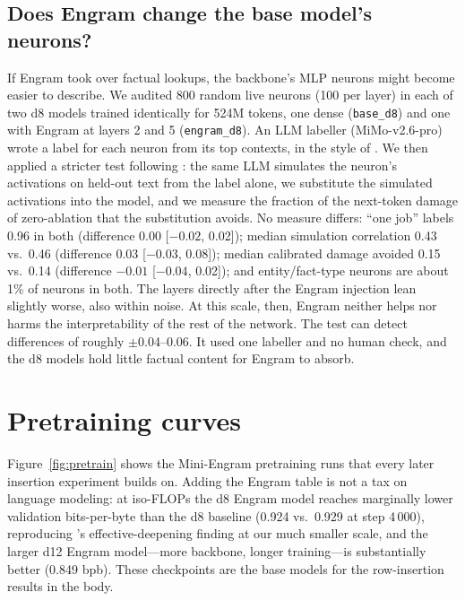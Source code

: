 \documentclass[11pt]{article}
\begin{document}
\subsection{Does Engram change the base model's neurons?}
\label{app:followup-t5}

If Engram took over factual lookups, the backbone's MLP neurons might
become easier to describe. We audited 800 random live neurons
(100 per layer) in each of two d8 models trained identically for
524M tokens, one dense (\texttt{base\_d8}) and one with Engram at
layers 2 and 5 (\texttt{engram\_d8}). An LLM labeller (MiMo-v2.6-pro)
wrote a label for each neuron from its top contexts, in the style of
\citet{bills2023explain}. We then applied a stricter test following
\citet{gao2026notclean}: the same LLM simulates the neuron's
activations on held-out text from the label alone, we substitute the
simulated activations into the model, and we measure the fraction of
the next-token damage of zero-ablation that the substitution avoids.
No measure differs: ``one job'' labels 0.96 in both (difference 0.00
[$-0.02$, 0.02]); median simulation correlation 0.43 vs.\ 0.46
(difference 0.03 [$-0.03$, 0.08]); median calibrated damage avoided
0.15 vs.\ 0.14 (difference $-0.01$ [$-0.04$, 0.02]); and
entity/fact-type neurons are about 1\% of neurons in both. The layers
directly after the Engram injection lean slightly worse, also within
noise. At this scale, then, Engram neither helps nor harms the
interpretability of the rest of the network. The test can detect
differences of roughly $\pm$0.04--0.06. It used one labeller and no
human check, and the d8 models hold little factual content for Engram
to absorb.

\section{Pretraining curves}
\label{app:pretrain}

Figure~\ref{fig:pretrain} shows the Mini-Engram pretraining runs that
every later insertion experiment builds on. Adding the Engram table is
not a tax on language modeling: at iso-FLOPs the d8 Engram model
reaches marginally lower validation bits-per-byte than the d8 baseline
(0.924 vs.\ 0.929 at step 4\,000), reproducing
\citeauthor{cheng2026engram}'s effective-deepening finding at our much
smaller scale, and the larger d12 Engram model---more backbone, longer
training---is substantially better (0.849 bpb). These checkpoints are
the base models for the row-insertion results in the body.
\end{document}
